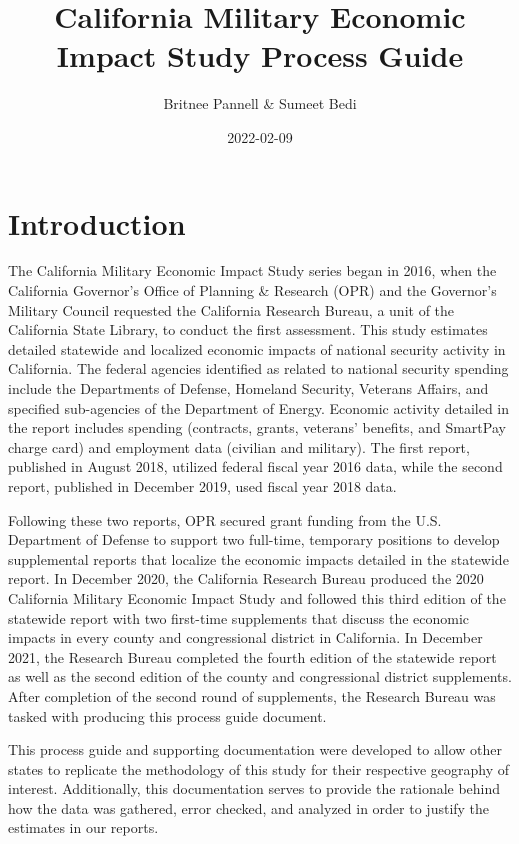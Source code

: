\documentclass[
]{book}
\title{California Military Economic Impact Study Process Guide}
\author{Britnee Pannell \& Sumeet Bedi}
\date{2022-02-09}
\begin{document}
\maketitle

{
\setcounter{tocdepth}{1}
\tableofcontents
}
\hypertarget{introduction}{%
\chapter{Introduction}\label{introduction}}

The California Military Economic Impact Study series began in 2016, when the California Governor's Office of Planning \& Research (OPR) and the Governor's Military Council requested the California Research Bureau, a unit of the California State Library, to conduct the first assessment. This study estimates detailed statewide and localized economic impacts of national security activity in California. The federal agencies identified as related to national security spending include the Departments of Defense, Homeland Security, Veterans Affairs, and specified sub-agencies of the Department of Energy. Economic activity detailed in the report includes spending (contracts, grants, veterans' benefits, and SmartPay charge card) and employment data (civilian and military). The first report, published in August 2018, utilized federal fiscal year 2016 data, while the second report, published in December 2019, used fiscal year 2018 data.

Following these two reports, OPR secured grant funding from the U.S. Department of Defense to support two full-time, temporary positions to develop supplemental reports that localize the economic impacts detailed in the statewide report. In December 2020, the California Research Bureau produced the 2020 California Military Economic Impact Study and followed this third edition of the statewide report with two first-time supplements that discuss the economic impacts in every county and congressional district in California. In December 2021, the Research Bureau completed the fourth edition of the statewide report as well as the second edition of the county and congressional district supplements. After completion of the second round of supplements, the Research Bureau was tasked with producing this process guide document.

This process guide and supporting documentation were developed to allow other states to replicate the methodology of this study for their respective geography of interest. Additionally, this documentation serves to provide the rationale behind how the data was gathered, error checked, and analyzed in order to justify the estimates in our reports.
\end{document}
